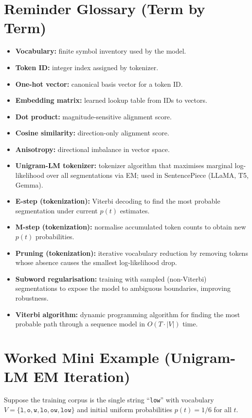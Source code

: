 \section*{Reminder Glossary (Term by Term)}
\begin{itemize}[leftmargin=1.5em]
  \item \textbf{Vocabulary:} finite symbol inventory used by the model.
  \item \textbf{Token ID:} integer index assigned by tokenizer.
  \item \textbf{One-hot vector:} canonical basis vector for a token ID.
  \item \textbf{Embedding matrix:} learned lookup table from IDs to vectors.
  \item \textbf{Dot product:} magnitude-sensitive alignment score.
  \item \textbf{Cosine similarity:} direction-only alignment score.
  \item \textbf{Anisotropy:} directional imbalance in vector space.
  \item \textbf{Unigram-LM tokenizer:} tokenizer algorithm that maximises marginal log-likelihood over all segmentations via EM; used in SentencePiece (LLaMA, T5, Gemma).
  \item \textbf{E-step (tokenization):} Viterbi decoding to find the most probable segmentation under current $p(t)$ estimates.
  \item \textbf{M-step (tokenization):} normalise accumulated token counts to obtain new $p(t)$ probabilities.
  \item \textbf{Pruning (tokenization):} iterative vocabulary reduction by removing tokens whose absence causes the smallest log-likelihood drop.
  \item \textbf{Subword regularisation:} training with sampled (non-Viterbi) segmentations to expose the model to ambiguous boundaries, improving robustness.
  \item \textbf{Viterbi algorithm:} dynamic programming algorithm for finding the most probable path through a sequence model in $O(T \cdot |V|)$ time.
\end{itemize}

\section*{Worked Mini Example (Unigram-LM EM Iteration)}
Suppose the training corpus is the single string ``\texttt{low}'' with vocabulary $V = \{\texttt{l},\texttt{o},\texttt{w},\texttt{lo},\texttt{ow},\texttt{low}\}$ and initial uniform probabilities $p(t) = 1/6$ for all $t$.


